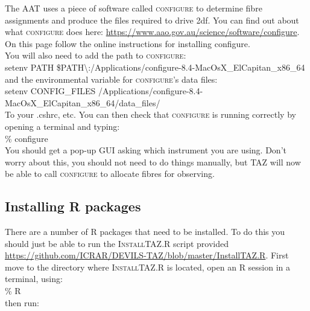 \documentclass[12pt]{article}
\begin{document}
The AAT uses a piece of software called \textsc{configure} to determine fibre assignments and produce the files required to drive 2df. You can find out about what \textsc{configure} does here: \url{https://www.aao.gov.au/science/software/configure}. On this page follow the online instructions for installing configure.  \\

You will also need to add the path to \textsc{configure}:\\

\hspace{10mm} setenv PATH \$PATH\textbackslash:/Applications/configure-8.4-MacOsX\_ElCapitan\_x86\_64\\

and the environmental variable for \textsc{configure}'s data files:\\

\hspace{10mm}  setenv CONFIG\_FILES /Applications/configure-8.4-MacOsX\_ElCapitan\_x86\_64/data\_files/\\

To your .cshrc, etc.  You can then check that \textsc{configure} is running correctly by opening a terminal and typing: \\

\hspace{10mm} \% configure\\

You should get a pop-up GUI asking which instrument you are using. Don't worry about this, you should not need to do things manually, but \textsc{TAZ} will now be able to call \textsc{configure} to allocate fibres for observing.

\subsection{Installing R packages}

There are a number of R packages that need to be installed. To do this you should just be able to run the \textsc{InstallTAZ.R} script provided \url{https://github.com/ICRAR/DEVILS-TAZ/blob/master/InstallTAZ.R}. First move to the directory where \textsc{InstallTAZ.R} is located, open an R session in a terminal, using:\\

\hspace{10mm} \% R\\

then run:\\
\end{document}
